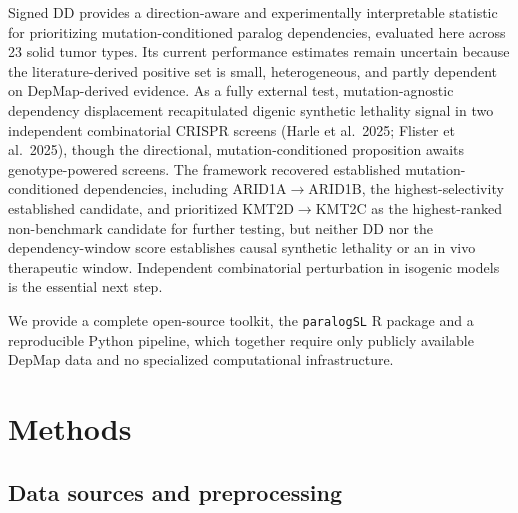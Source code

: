 \documentclass[11pt,a4paper]{article}
\begin{document}
Signed DD provides a direction-aware and experimentally interpretable statistic for prioritizing mutation-conditioned paralog dependencies, evaluated here across 23 solid tumor types. Its current performance estimates remain uncertain because the literature-derived positive set is small, heterogeneous, and partly dependent on DepMap-derived evidence. As a fully external test, mutation-agnostic dependency displacement recapitulated digenic synthetic lethality signal in two independent combinatorial CRISPR screens (Harle et al.\ 2025; Flister et al.\ 2025), though the directional, mutation-conditioned proposition awaits genotype-powered screens. The framework recovered established mutation-conditioned dependencies, including ARID1A$\rightarrow$ARID1B, the highest-selectivity established candidate, and prioritized KMT2D$\rightarrow$KMT2C as the highest-ranked non-benchmark candidate for further testing, but neither DD nor the dependency-window score establishes causal synthetic lethality or an in vivo therapeutic window. Independent combinatorial perturbation in isogenic models is the essential next step.

We provide a complete open-source toolkit, the \texttt{paralogSL} R package and a reproducible Python pipeline, which together require only publicly available DepMap data and no specialized computational infrastructure.


\section*{Methods}

\subsection*{Data sources and preprocessing}
\end{document}

